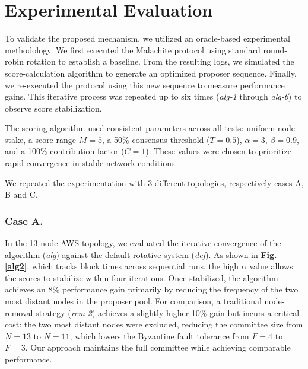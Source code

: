 \section{Experimental Evaluation}
\label{sec:experiments}

To validate the proposed mechanism, we utilized an oracle-based experimental methodology. 
We first executed the Malachite protocol using standard round-robin rotation to establish a baseline. 
From the resulting logs, we simulated the score-calculation algorithm to generate an optimized proposer sequence. 
Finally, we re-executed the protocol using this new sequence to measure performance gains. This iterative process was repeated up to six times (\textit{alg-1} through \textit{alg-6}) to observe score stabilization. 


The scoring algorithm used consistent parameters across all tests: uniform node stake, a score range $M=5$, a 50\% consensus threshold ($T=0.5$), $\alpha=3$, $\beta=0.9$, and a 100\% contribution factor ($C=1$). These values were chosen to prioritize rapid convergence in stable network conditions.

We repeated the experimentation with 3 different topologies, respectively cases A, B and C.

\subsubsection{Case A.} 
In the 13-node AWS topology, we evaluated the iterative convergence of the algorithm (\textit{alg}) against the default rotative system (\textit{def}). As shown in \textbf{Fig. \ref{alg2}}, which tracks block times across sequential runs, the high $\alpha$ value allows the scores to stabilize within four iterations. Once stabilized, the algorithm achieves an 8\% performance gain primarily by reducing the frequency of the two most distant nodes in the proposer pool. For comparison, a traditional node-removal strategy (\textit{rem-2}) achieves a slightly higher 10\% gain but incurs a critical cost: 
the two most distant nodes were excluded, reducing the committee size from $N=13$ to $N=11$, which lowers the Byzantine fault tolerance from $F=4$ to $F=3$. Our approach maintains the full committee while achieving comparable performance.

